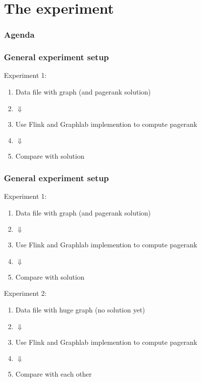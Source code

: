 \section{The experiment}

\begin{frame}
\frametitle{Agenda}
\tableofcontents[currentsection]
\end{frame}

\begin{frame}
\frametitle{General experiment setup}
Experiment 1:
\begin{enumerate}
\item Data file with graph (and pagerank solution)
\item[] $\Downarrow$
\item Use Flink and Graphlab implemention to compute pagerank
\item[] $\Downarrow$
\item Compare with solution
\end{enumerate}

\end{frame}


\begin{frame}
\frametitle{General experiment setup}
Experiment 1:
\begin{enumerate}
\item Data file with graph (and pagerank solution)
\item[] $\Downarrow$
\item Use Flink and Graphlab implemention to compute pagerank
\item[] $\Downarrow$
\item Compare with solution
\end{enumerate}

Experiment 2:

\begin{enumerate}
\item Data file with huge graph (no solution yet)
\item[] $\Downarrow$
\item Use Flink and Graphlab implemention to compute pagerank
\item[] $\Downarrow$
\item Compare with each other
\end{enumerate}
\end{frame}

